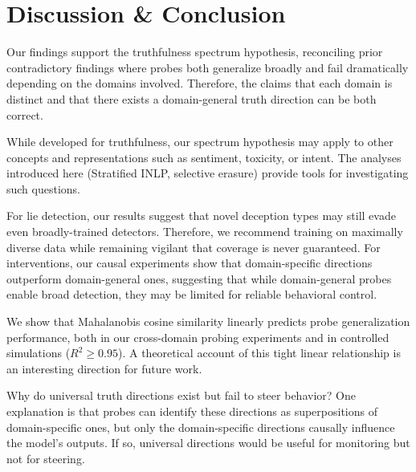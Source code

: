 \documentclass{article}
\theoremstyle{plain}
\theoremstyle{definition}
\theoremstyle{remark}
\begin{document}


\section{Discussion \& Conclusion}

Our findings support the truthfulness spectrum hypothesis, reconciling prior contradictory findings where probes both generalize broadly and fail dramatically depending on the domains involved. Therefore, the claims that each domain is distinct and that there exists a domain-general truth direction can be both correct. 

While developed for truthfulness, our spectrum hypothesis may apply to other concepts and representations such as sentiment, toxicity, or intent. The analyses introduced here (Stratified INLP, selective erasure) provide tools for investigating such questions.

For lie detection, our results suggest that novel deception types may still evade even broadly-trained detectors. Therefore, we recommend training on maximally diverse data while remaining vigilant that coverage is never guaranteed. For interventions, our causal experiments show that domain-specific directions outperform domain-general ones, suggesting that while domain-general probes enable broad detection, they may be limited for reliable behavioral control.

We show that Mahalanobis cosine similarity linearly predicts probe generalization performance, both in our cross-domain probing experiments and in controlled simulations ($R^2 \geq 0.95$). A theoretical account of this tight linear relationship is an interesting direction for future work.

Why do universal truth directions exist but fail to steer behavior? One explanation is that probes can identify these directions as superpositions of domain-specific ones, but only the domain-specific directions causally influence the model's outputs. If so, universal directions would be useful for monitoring but not for steering.

\end{document}
